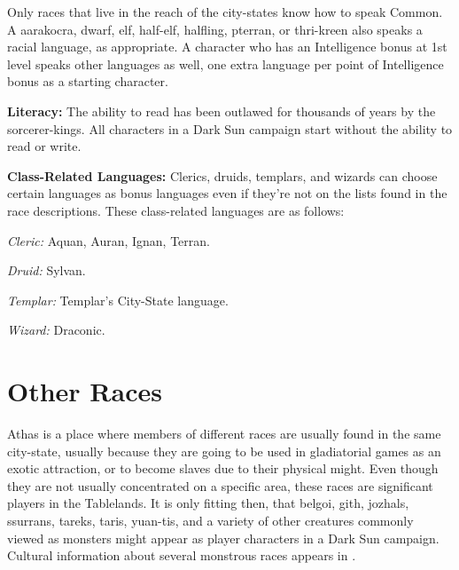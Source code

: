 Only races that live in the reach of the city-states know how to speak Common. A aarakocra, dwarf, elf, half-elf, halfling, pterran, or thri-kreen also speaks a racial language, as appropriate. A character who has an Intelligence bonus at 1st level speaks other languages as well, one extra language per point of Intelligence bonus as a starting character.

\textbf{Literacy:} The ability to read has been outlawed for thousands of years by the sorcerer-kings. All characters in a {\tableheader Dark Sun} campaign start without the ability to read or write.

\textbf{Class-Related Languages:} Clerics, druids, templars, and wizards can choose certain languages as bonus languages even if they're not on the lists found in the race descriptions. These class-related languages are as follows:

\textit{Cleric:} Aquan, Auran, Ignan, Terran.

\textit{Druid:} Sylvan.

\textit{Templar:} Templar's City-State language.

\textit{Wizard:} Draconic.










\vskip3cm


\vskip10cm
\section{Other Races}
Athas is a place where members of different races are usually found in the same city-state, usually because they are going to be used in gladiatorial games as an exotic attraction, or to become slaves due to their physical might. Even though they are not usually concentrated on a specific area, these races are significant players in the Tablelands. It is only fitting then, that belgoi, gith, jozhals, ssurrans, tareks, taris, yuan-tis, and a variety of other creatures commonly viewed as monsters might appear as player characters in a {\tableheader Dark Sun} campaign. Cultural information about several monstrous races appears in .